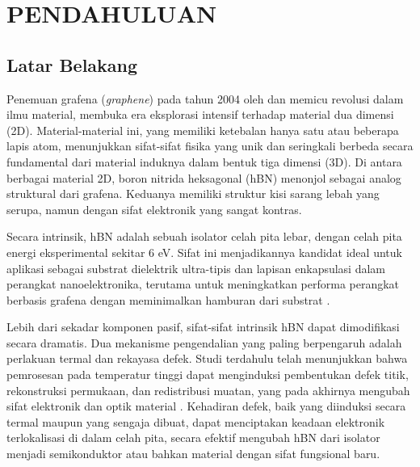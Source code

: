 \renewcommand{\thechapter}{\Roman{chapter}}
\chapter{PENDAHULUAN}
\renewcommand{\thechapter}{\arabic{chapter}}
\pagestyle{konten}

\section{Latar Belakang}
Penemuan grafena (\textit{graphene}) pada tahun 2004 oleh \cite{Novoselov2004} dan \cite{Geim2007} memicu revolusi dalam ilmu material, membuka era eksplorasi intensif terhadap material dua dimensi (2D). Material-material ini, yang memiliki ketebalan hanya satu atau beberapa lapis atom, menunjukkan sifat-sifat fisika yang unik dan seringkali berbeda secara fundamental dari material induknya dalam bentuk tiga dimensi (3D). Di antara berbagai material 2D, boron nitrida heksagonal (hBN) menonjol sebagai analog struktural dari grafena. Keduanya memiliki struktur kisi sarang lebah yang serupa, namun dengan sifat elektronik yang sangat kontras.

Secara intrinsik, hBN adalah sebuah isolator celah pita lebar, dengan celah pita energi eksperimental sekitar 6 eV. Sifat ini menjadikannya kandidat ideal untuk aplikasi sebagai substrat dielektrik ultra-tipis dan lapisan enkapsulasi dalam perangkat nanoelektronika, terutama untuk meningkatkan performa perangkat berbasis grafena dengan meminimalkan hamburan dari substrat \citep{Dean2010}.

Lebih dari sekadar komponen pasif, sifat-sifat intrinsik hBN dapat dimodifikasi secara dramatis. Dua mekanisme pengendalian yang paling berpengaruh adalah perlakuan termal dan rekayasa defek. Studi terdahulu telah menunjukkan bahwa pemrosesan pada temperatur tinggi dapat menginduksi pembentukan defek titik, rekonstruksi permukaan, dan redistribusi muatan, yang pada akhirnya mengubah sifat elektronik dan optik material \citep{Zhang2020, Huang2012}. Kehadiran defek, baik yang diinduksi secara termal maupun yang sengaja dibuat, dapat menciptakan keadaan elektronik terlokalisasi di dalam celah pita, secara efektif mengubah hBN dari isolator menjadi semikonduktor atau bahkan material dengan sifat fungsional baru.

